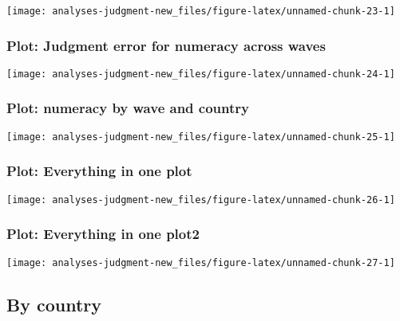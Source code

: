 \documentclass[
]{article}
\begin{document}
\begin{center}\texttt{[image: analyses-judgment-new\_files/figure-latex/unnamed-chunk-23-1]} \end{center}

\hypertarget{plot-judgment-error-for-numeracy-across-waves}{%
\subsubsection{Plot: Judgment error for numeracy across
waves}\label{plot-judgment-error-for-numeracy-across-waves}}

\begin{center}\texttt{[image: analyses-judgment-new\_files/figure-latex/unnamed-chunk-24-1]} \end{center}

\hypertarget{plot-numeracy-by-wave-and-country}{%
\subsubsection{Plot: numeracy by wave and
country}\label{plot-numeracy-by-wave-and-country}}

\begin{center}\texttt{[image: analyses-judgment-new\_files/figure-latex/unnamed-chunk-25-1]} \end{center}

\hypertarget{plot-everything-in-one-plot}{%
\subsubsection{Plot: Everything in one
plot}\label{plot-everything-in-one-plot}}

\begin{center}\texttt{[image: analyses-judgment-new\_files/figure-latex/unnamed-chunk-26-1]} \end{center}

\hypertarget{plot-everything-in-one-plot2}{%
\subsubsection{Plot: Everything in one
plot2}\label{plot-everything-in-one-plot2}}

\begin{center}\texttt{[image: analyses-judgment-new\_files/figure-latex/unnamed-chunk-27-1]} \end{center}

\hypertarget{by-country}{%
\subsection{By country}\label{by-country}}
\end{document}
